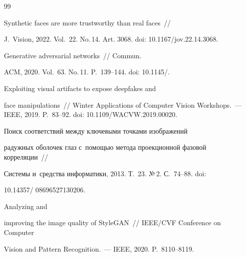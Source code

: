 {\small\frenchspacing


{%







\vspace*{-2pt}





\begin{thebibliography}{99}




   Synthetic faces are more trustworthy than real faces~/\!\!/ 


J.~Vision, 2022. Vol.~22. No.\,14. Art. 3068. doi: 10.1167\!/\!jov.22.14.3068.




   Generative adversarial networks~/\!\!/ Commun. 


ACM, 2020. Vol.~63. No.\,11. P.~139--144. doi: 10.1145\!/.




   Exploiting visual artifacts to expose deepfakes and 


face manipulations~/\!\!/ Winter Applications of Computer Vision Workshops.~--- IEEE, 2019. P.~83--92. doi: 10.1109\!/\!WACVW.2019.00020.




 Поиск соответствий между ключевыми точками изображений 


радужных оболочек глаз с~помощью метода проекционной фазовой корреляции~/\!\!/ 


Системы и~средства информатики, 2013. Т.~23. №\,2. С.~74--88. doi: 


10.14357\!/ 08696527130206.


  




   Analyzing and 


improving the image quality of StyleGAN~/\!\!/ IEEE\!/\!CVF Conference on Computer 


Vision and Pattern Recognition.~--- IEEE, 2020. P.~8110--8119.



\end{thebibliography}}}
